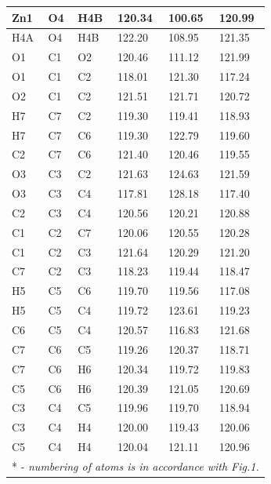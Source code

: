 \begin{longtable}{|l|l|l|lll|}
Zn1 & O4 & H4B & \multicolumn{1}{l|}{120.34} & \multicolumn{1}{l|}{100.65} & 120.99 \\ \hline
H4A & O4 & H4B & \multicolumn{1}{l|}{122.20} & \multicolumn{1}{l|}{108.95} & 121.35 \\ \hline
O1 & C1 & O2 & \multicolumn{1}{l|}{120.46} & \multicolumn{1}{l|}{111.12} & 121.99 \\ \hline
O1 & C1 & C2 & \multicolumn{1}{l|}{118.01} & \multicolumn{1}{l|}{121.30} & 117.24 \\ \hline
O2 & C1 & C2 & \multicolumn{1}{l|}{121.51} & \multicolumn{1}{l|}{121.71} & 120.72 \\ \hline
H7 & C7 & C2 & \multicolumn{1}{l|}{119.30} & \multicolumn{1}{l|}{119.41} & 118.93 \\ \hline
H7 & C7 & C6 & \multicolumn{1}{l|}{119.30} & \multicolumn{1}{l|}{122.79} & 119.60 \\ \hline
C2 & C7 & C6 & \multicolumn{1}{l|}{121.40} & \multicolumn{1}{l|}{120.46} & 119.55 \\ \hline
O3 & C3 & C2 & \multicolumn{1}{l|}{121.63} & \multicolumn{1}{l|}{124.63} & 121.59 \\ \hline
O3 & C3 & C4 & \multicolumn{1}{l|}{117.81} & \multicolumn{1}{l|}{128.18} & 117.40 \\ \hline
C2 & C3 & C4 & \multicolumn{1}{l|}{120.56} & \multicolumn{1}{l|}{120.21} & 120.88 \\ \hline
C1 & C2 & C7 & \multicolumn{1}{l|}{120.06} & \multicolumn{1}{l|}{120.55} & 120.28 \\ \hline
C1 & C2 & C3 & \multicolumn{1}{l|}{121.64} & \multicolumn{1}{l|}{120.29} & 121.20 \\ \hline
C7 & C2 & C3 & \multicolumn{1}{l|}{118.23} & \multicolumn{1}{l|}{119.44} & 118.47 \\ \hline
H5 & C5 & C6 & \multicolumn{1}{l|}{119.70} & \multicolumn{1}{l|}{119.56} & 117.08 \\ \hline
H5 & C5 & C4 & \multicolumn{1}{l|}{119.72} & \multicolumn{1}{l|}{123.61} & 119.23 \\ \hline
C6 & C5 & C4 & \multicolumn{1}{l|}{120.57} & \multicolumn{1}{l|}{116.83} & 121.68 \\ \hline
C7 & C6 & C5 & \multicolumn{1}{l|}{119.26} & \multicolumn{1}{l|}{120.37} & 118.71 \\ \hline
C7 & C6 & H6 & \multicolumn{1}{l|}{120.34} & \multicolumn{1}{l|}{119.72} & 119.83 \\ \hline
C5 & C6 & H6 & \multicolumn{1}{l|}{120.39} & \multicolumn{1}{l|}{121.05} & 120.69 \\ \hline
C3 & C4 & C5 & \multicolumn{1}{l|}{119.96} & \multicolumn{1}{l|}{119.70} & 118.94 \\ \hline
C3 & C4 & H4 & \multicolumn{1}{l|}{120.00} & \multicolumn{1}{l|}{119.43} & 120.06 \\ \hline
C5 & C4 & H4 & \multicolumn{1}{l|}{120.04} & \multicolumn{1}{l|}{121.11} & 120.96 \\ \hline
\multicolumn{6}{|l|}{* - \emph{numbering of atoms is in accordance with Fig.1.}} \\ \hline
\end{longtable}

